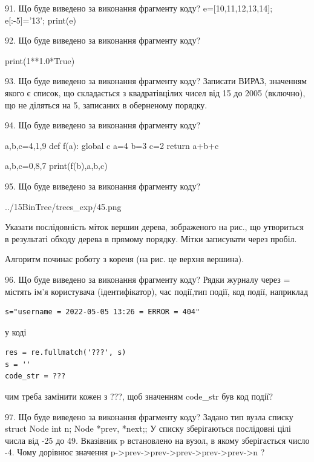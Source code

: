 \documentclass[11pt]{article}
\begin{document}

91. Що буде виведено за виконання фрагменту коду?
e=[10,11,12,13,14]; e[:-5]='13'; print(e)

92. Що буде виведено за виконання фрагменту коду?

print(1**1.0*True)


93. Що буде виведено за виконання фрагменту коду?
Записати ВИРАЗ, значенням якого є список, що складається з квадратівцілих чисел від 15 до 2005 (включно), що не діляться на 5, записаних в оберненому порядку.

94. Що буде виведено за виконання фрагменту коду?

a,b,c=4,1,9
def f(a):
global c    a=4
    b=3
    c=2
    return a+b+c

a,b,c=0,8,7
print(f(b),a,b,c)


95. Що буде виведено за виконання фрагменту коду?

\begin{center}
	{../15BinTree/trees_exp/45.png}
\end{center}
Указати послідовність міток вершин дерева, зображеного на рис., що утвориться в результаті обходу дерева в прямому порядку. Мітки записувати через пробіл.\par Алгоритм починає роботу з кореня (на рис. це верхня вершина).


96. Що буде виведено за виконання фрагменту коду?
Рядки журналу через = містять ім'я користувача (ідентифікатор), час події,тип події, код події, наприклад
\begin{verbatim}
s="username = 2022-05-05 13:26 = ERROR = 404"
\end{verbatim}
у коді 
\begin{verbatim}
res = re.fullmatch('???', s) 
s = ''
code_str = ??? 
\end{verbatim}
чим треба замінити кожен з ???, щоб значенням code\_str був код події? 




97. Що буде виведено за виконання фрагменту коду?
Задано тип вузла списку struct Node {int n; Node *prev, *next;};
У списку зберігаються послідовні цілі числа від -25 до 49. Вказівник p встановлено на вузол, в якому зберігається число -4.
Чому дорівнює значення p->prev->prev->prev->prev->prev->n ?
\end{document}
